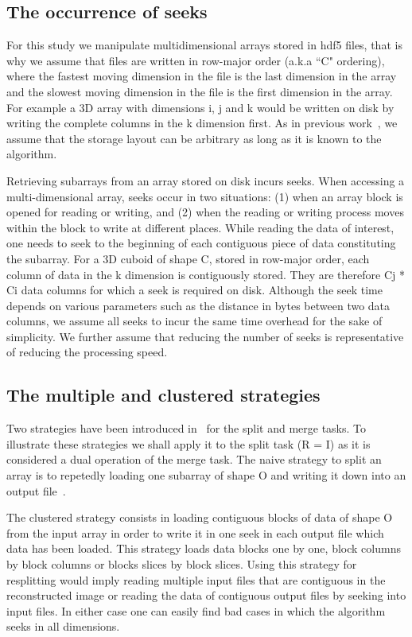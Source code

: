 \documentclass[conference]{IEEEtran}
\begin{document}
\subsection{The occurrence of seeks}
For this study we manipulate multidimensional arrays stored in hdf5 files,
that is why we assume that files are written in row-major order (a.k.a ``C" ordering),
where the fastest moving dimension in the file is the last dimension in the
array and the slowest moving dimension in the file is the first dimension
in the array. For example a 3D array with dimensions i, j and k would be
written on disk by writing the complete columns in the k dimension first.
As in previous work~\cite{seqalgorithms}, we assume that the storage layout can
be arbitrary as long as it is known to the algorithm.

Retrieving subarrays from an array stored on disk incurs seeks. When accessing a
multi-dimensional array, seeks occur in two situations:
(1) when an array block is opened for reading or writing, and (2) when the
reading or writing process moves within the block to write at different
places. While reading the data of interest, one needs to seek to the
beginning of each contiguous piece of data
constituting the subarray. For a 3D cuboid of shape C, stored in row-major order,
each column of data in the k dimension is contiguously stored. They are therefore
Cj * Ci data columns for which a seek is required on disk. Although the seek
time depends on various parameters such as the distance in bytes between two
data columns, we assume all seeks to incur the same time overhead for the sake
of simplicity. We further assume that reducing the number of seeks is representative
of reducing the processing speed.

\subsection{The multiple and clustered strategies}
Two strategies have been introduced in~\cite{seqalgorithms} for the split and
merge tasks. To illustrate these strategies we shall apply it to the split task
(R = I) as it is considered a dual operation of the merge task.
The naive strategy to split an array is to repetedly loading one
subarray of shape O and writing it down into an output file~\cite{seqalgorithms}.

The clustered strategy consists in loading contiguous blocks of data of shape O
from the input array in order to write it in one seek in each output file which
data has been loaded. This strategy loads data blocks one by one, block columns
by block columns or blocks slices by block slices. Using this strategy for
resplitting would imply reading multiple input files that are contiguous in the
reconstructed image or reading the data of contiguous output files by seeking into
input files. In either case one can easily find bad cases in which the algorithm
seeks in all dimensions.
\end{document}
